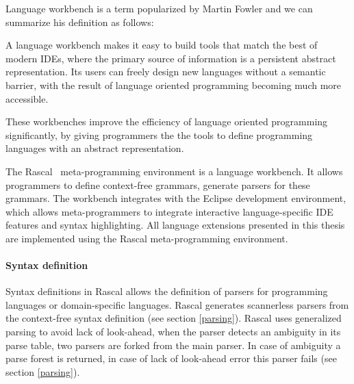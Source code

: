 Language workbench is a term popularized by Martin Fowler and we can summarize his definition as follows:

A language workbench makes it easy to build tools that match the best of modern IDEs, where the primary source of information is a persistent abstract representation. Its users can freely design new languages without a semantic barrier, with the result of language oriented programming becoming much more accessible.~\cite{Fowler2005}

These workbenches improve the efficiency of language oriented programming~\cite{Ward1994} significantly, by giving programmers the the tools to define programming languages with an abstract representation.

The Rascal~\cite{Klinta} meta-programming environment is a language workbench. It allows programmers to define context-free grammars, generate parsers for these grammars. The workbench integrates with the Eclipse development environment, which allows meta-programmers to integrate interactive language-specific IDE features and syntax highlighting. All language extensions presented in this thesis are implemented using the Rascal meta-programming environment.

\paragraph{Syntax definition}
Syntax definitions in Rascal allows the definition of parsers for programming languages or domain-specific languages. Rascal generates scannerless parsers from the context-free syntax definition (see section \ref{parsing}). Rascal uses generalized parsing to avoid lack of look-ahead, when the parser detects an ambiguity in its parse table, two parsers are forked from the main parser. In case of ambiguity a parse forest is returned, in case of lack of look-ahead error this parser fails (see section \ref{parsing}).

